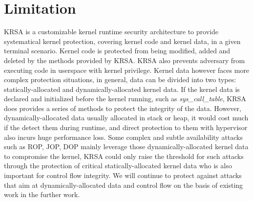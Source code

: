 \documentclass[conference]{IEEEtran}
\begin{document}
\section{Limitation}
KRSA is a customizable kernel runtime security architecture to provide systematical kernel protection, covering kernel code and kernel data, in a given terminal scenario. Kernel code is protected from being modified, added and deleted by the methods provided by KRSA. KRSA also prevents adversary from executing code in userspace with kernel privilege. Kernel data however faces more complex protection situations, in general, data can be divided into two types: statically-allocated and dynamically-allocated kernel data. If the kernel data is declared and initialized before the kernel running, such as \textit{sys\_call\_table}, KRSA does provides a series of methods to protect the integrity of the data. However, dynamically-allocated data usually allocated in stack or heap, it would cost much if the detect them during runtime, and direct protection to them with hypervisor also incurs huge performance loss. 
Some complex and subtle availability attacks such as ROP, JOP, DOP mainly leverage those dynamically-allocated kernel data to compromise the kernel, KRSA could only raise the threshold for such attacks through the protection of critical statically-allocated kernel data who is also important for control flow integrity. We will continue to protect against attacks that aim at dynamically-allocated data and control flow on the basis of existing work in the further work. 
\end{document}
